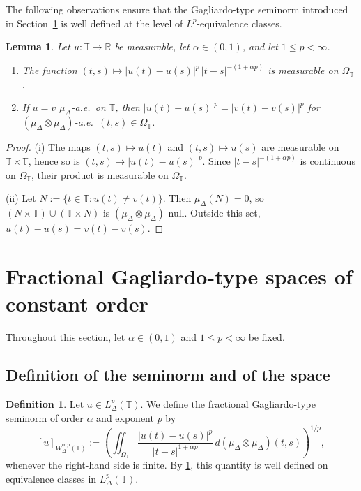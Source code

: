 \documentclass[11pt,a4paper]{article}
\numberwithin{equation}{section}
\newtheorem{lemma}[lemma]{Lemma}
\theoremstyle{definition}
\newtheorem{definition}[definition]{Definition}
\newcommand{\R}{\mathbb{R}}
\newcommand{\T}{\mathbb{T}}
\begin{document}
The following observations ensure that the Gagliardo-type seminorm introduced in Section~\ref{sec:constant-order} is well defined at the level of $L^p$-equivalence classes.

\begin{lemma}\label{lem:kernel-wellposed}
Let $u:\T\to\R$ be measurable, let $\alpha\in(0,1)$, and let $1\le p<\infty$.
\begin{enumerate}
\item[\textup{(i)}] The function $(t,s)\mapsto |u(t)-u(s)|^p\,|t-s|^{-(1+\alpha p)}$ is measurable on $\Omega_{\T}$.
\item[\textup{(ii)}] If $u=v$ $\mu_\Delta$-a.e.\ on $\T$, then $|u(t)-u(s)|^p = |v(t)-v(s)|^p$ for $(\mu_\Delta\otimes\mu_\Delta)$-a.e.\ $(t,s)\in\Omega_{\T}$.
\end{enumerate}
\end{lemma}

\begin{proof}
\textup{(i)} The maps $(t,s)\mapsto u(t)$ and $(t,s)\mapsto u(s)$ are measurable on $\T\times\T$, hence so is $(t,s)\mapsto |u(t)-u(s)|^p$. Since $|t-s|^{-(1+\alpha p)}$ is continuous on $\Omega_{\T}$, their product is measurable on $\Omega_{\T}$.

\textup{(ii)} Let $N:=\{t\in\T: u(t)\neq v(t)\}$. Then $\mu_\Delta(N)=0$, so $(N\times\T)\cup(\T\times N)$ is $(\mu_\Delta\otimes\mu_\Delta)$-null. Outside this set, $u(t)-u(s)=v(t)-v(s)$.
\end{proof}


\section{Fractional Gagliardo-type spaces of constant order}\label{sec:constant-order}

Throughout this section, let $\alpha\in(0,1)$ and $1\le p<\infty$ be fixed.

\subsection{Definition of the seminorm and of the space}

\begin{definition}\label{def:gagliardo-seminorm}
Let $u\in L^p_{\Delta}(\T)$. We define the fractional Gagliardo-type seminorm of order $\alpha$ and exponent $p$ by
\begin{equation}\label{eq:gagliardo-seminorm}
[u]_{W^{\alpha,p}_{\Delta}(\T)}
:=
\left(
\iint_{\Omega_{\T}}
\frac{|u(t)-u(s)|^p}{|t-s|^{1+\alpha p}}
\,d(\mu_\Delta\otimes\mu_\Delta)(t,s)
\right)^{1/p},
\end{equation}
whenever the right-hand side is finite. By \cref{lem:kernel-wellposed}, this quantity is well defined on equivalence classes in $L^p_{\Delta}(\T)$.
\end{definition}
\end{document}
